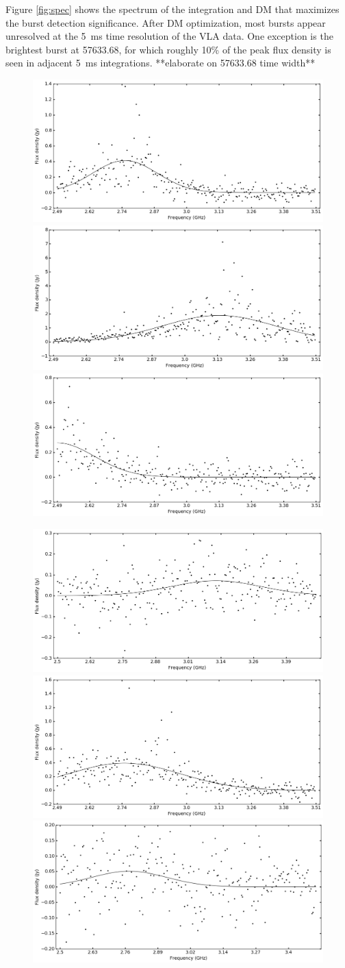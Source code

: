 \documentclass[twocolumn]{aastex61}
\begin{document}
Figure \ref{fig:spec} shows the spectrum of the integration and DM that maximizes the burst detection significance. After DM optimization, most bursts appear unresolved at the 5~ms time resolution of the VLA data. One exception is the brightest burst at 57633.68, for which roughly 10\% of the peak flux density is seen in adjacent 5~ms integrations. **elaborate on 57633.68 time width**

\begin{figure}[ht]
\begin{center}
 \begin{minipage}{2\columnwidth}
  \includegraphics[width=0.33\columnwidth]{spec_57623.png}
  \includegraphics[width=0.33\columnwidth]{spec_57633_scan7.png}
  \includegraphics[width=0.33\columnwidth]{spec_57633_scan13.png}
 \end{minipage}

 \begin{minipage}{2\columnwidth}
  \includegraphics[width=0.33\columnwidth]{spec_57638.png}
  \includegraphics[width=0.33\columnwidth]{spec_57643.png}
  \includegraphics[width=0.33\columnwidth]{spec_57645.png}
 \end{minipage}


\end{center}
\end{figure}
\end{document}
